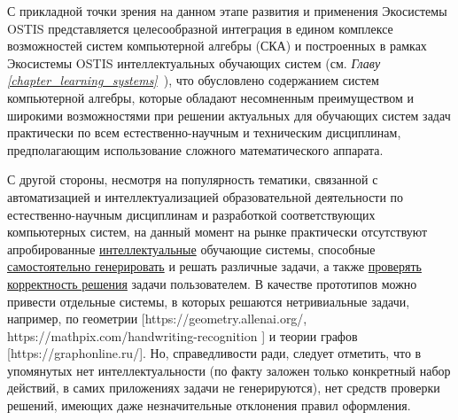 С прикладной точки зрения на данном этапе развития и применения Экосистемы OSTIS представляется целесообразной интеграция в едином комплексе возможностей систем компьютерной алгебры (СКА) и построенных в рамках Экосистемы OSTIS интеллектуальных обучающих систем (см. \textit{Главу \ref{chapter_learning_systems}~}), что обусловлено содержанием систем компьютерной алгебры, которые обладают несомненным преимуществом и широкими возможностями при решении актуальных для обучающих систем задач практически по всем естественно-научным и техническим дисциплинам, предполагающим использование сложного математического аппарата.

С другой стороны, несмотря на популярность тематики, связанной с автоматизацией и интеллектуализацией образовательной деятельности по естественно-научным дисциплинам и разработкой соответствующих компьютерных систем, на данный момент на рынке практически отсутствуют апробированные \underline{интеллектуальные} обучающие системы, способные \underline{самостоятельно генерировать} и решать различные задачи, а также \underline{проверять корректность решения} задачи пользователем. В качестве прототипов можно привести отдельные системы, в которых решаются нетривиальные задачи, например, по геометрии [https://geometry.allenai.org/, https://mathpix.com/handwriting-recognition ] и теории графов [https://graphonline.ru/]. Но, справедливости ради, следует отметить, что в упомянутых нет интеллектуальности (по факту заложен только конкретный набор действий, в самих приложениях задачи не генерируются), нет средств проверки решений, имеющих даже незначительные отклонения правил оформления.


